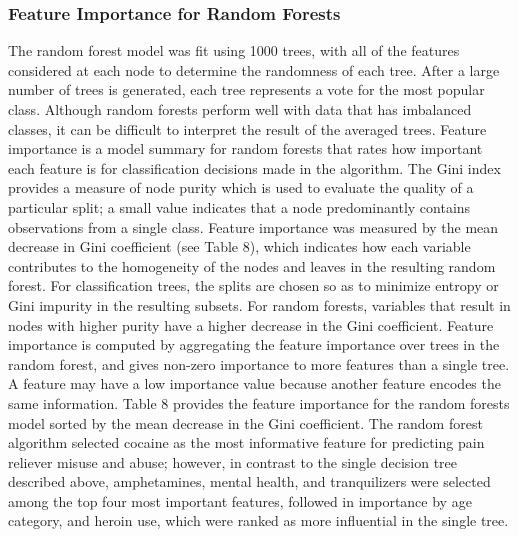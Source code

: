 \documentclass[sigconf]{acmart}
\begin{document}
\subsubsection{Feature Importance for Random Forests}

The random forest model was fit using 1000 trees, with all of the features 
considered at each node to determine the randomness of each tree. After a 
large number of trees is generated, each tree represents a vote for the
most popular class. Although random forests perform well with data that has
imbalanced classes, it can be difficult to interpret the result of the 
averaged trees. Feature importance is a model summary for random forests 
that rates how important each feature is for classification decisions made 
in the algorithm. The Gini index provides a measure of node purity which is 
used to evaluate the quality of a particular split; a small value indicates 
that a node predominantly contains observations from a single class. 
Feature importance was measured by the mean decrease in Gini coefficient 
(see Table 8), which indicates how each variable contributes to the 
homogeneity of the nodes and leaves in the resulting random forest. 
For classification trees, the splits are chosen so as to minimize entropy 
or Gini impurity in the resulting subsets. For random forests, variables 
that result in nodes with higher purity have a higher decrease in the Gini 
coefficient. Feature importance is computed by aggregating the feature 
importance over trees in the random forest, and gives non-zero importance
to more features than a single tree. A feature may have a low importance 
value because another feature encodes the same information. Table 8 provides 
the feature importance for the random forests model sorted by the mean 
decrease in the Gini coefficient. The random forest algorithm selected 
cocaine as the most informative feature for predicting pain reliever misuse
and abuse; however, in contrast to the single decision tree described above,
amphetamines, mental health, and tranquilizers were selected among the
top four most important features, followed in importance by age category, 
and heroin use, which were ranked as more influential in the single tree. 

\end{document}
